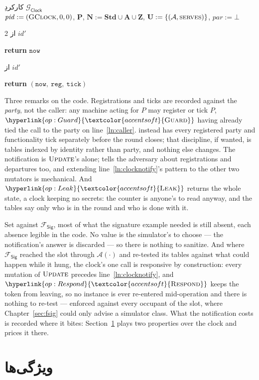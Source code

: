 \documentclass[10pt,oneside,openany]{book}
\makeatletter
\newcommand{\Ps}{\mathbf{P}}
\newcommand{\PID}{\mathit{pid}}
\newcommand{\admits}{\mathbf{N}}
\newcommand{\Apid}{\mathbf{A}}
\newcommand{\Zpid}{\mathbf{Z}}
\newcommand{\Stdpid}{\mathbf{Std}}
\newcommand{\pars}{\mathit{par}}
\newcommand{\uses}{\mathbf{U}}
\newcommand{\serves}{\op{serves}}
\newcommand{\Adv}{\mathcal{A}}
\newcommand{\op}[1]{\textnormal{\textsc{#1}}}
\newcommand{\opl}[1]{\hyperlink{op:#1}{\textcolor{accentsoft}{\op{#1}}}}
\newcommand{\id}{id}
\newcommand{\Fsig}{\mathcal{F}_{\mathsf{Sig}}}
\newcommand{\Gclock}{\mathcal{G}_{\mathsf{Clock}}}
\newcommand{\none}{\bot}
\newcommand{\V}[1]{\mathtt{#1}}
\newcounter{contline}
\newcommand{\algcont}{\setcounter{ALG@line}{\value{contline}}}
\newcommand{\algsave}{\setcounter{contline}{\value{ALG@line}}}
\newcommand{\params}[1]{{\footnotesize\normalfont\color{black!72} #1}}
\newcommand{\opsig}[1]{\textcolor{accent}{\underline{\smash{#1}}}}
\theoremstyle{accentdef}
\theoremstyle{accentplain}
\makeatother
\begin{document}
\begin{interface}[nofloat]{کارکردِ $\Gclock$ \\
\params{$\PID := (\op{G}\op{Clock},0,0)$, \quad $\Ps$, \quad
$\admits := \Stdpid \cup \Apid \cup \Zpid$, \quad $\uses := \{(\Adv,\serves)\}$, \quad $\pars := \none$}}
{\begin{multicols}{2}
\opsig{$\id.\op{Read}()$} \quad از $\id'$
\begin{algorithmic}[1]
\algcont
\State \textbf{return} $\V{now}$
\algsave
\end{algorithmic}
\vspace{1.4ex}

\opsig{$\id.\op{Leak}()$} \quad از $\id'$
\begin{algorithmic}[1]
\algcont
\State \textbf{return} $(\V{now},\ \V{reg},\ \V{tick})$
\algsave
\end{algorithmic}
\end{multicols}}
\end{interface}

Three remarks on the code. Registrations and ticks are recorded against the \emph{party}, not the
caller: any machine acting for $P$ may register or tick $P$, $\opl{Guard}$ having already tied the
call to the party on line~\ref{ln:caller}. \cite{BMTZ17} instead has every registered party and
functionality tick separately before the round closes; that discipline, if wanted, is tables
indexed by identity rather than party, and nothing else changes. The notification is
$\op{Update}$'s alone; \cite{BMTZ17} tells the adversary about registrations and departures too,
and extending line~\ref{ln:clocknotify}'s pattern to the other two mutators is mechanical. And
$\opl{Leak}$ returns the whole state, a clock keeping no secrets: the counter is anyone's to read
anyway, and the tables say only who is in the round and who is done with it.

Set against $\Fsig$, most of what the signature example needed is still absent, each absence
legible in the code. No value is the simulator's to choose --- the notification's answer is
discarded --- so there is nothing to sanitize. And where $\Fsig$ reached the slot through
$\Adv(\cdot)$ and re-tested its tables against what could happen while it hung, the clock's one
call is responsive by construction: every mutation of $\op{Update}$ precedes
line~\ref{ln:clocknotify}, and $\opl{Respond}$ keeps the token from leaving, so no instance is
ever re-entered mid-operation and there is nothing to re-test --- enforced against every occupant
of the slot, where Chapter~\ref{sec:fsig} could only advise a simulator class. What the
notification costs is recorded where it bites: Section~\ref{sec:clockprops} plays two properties
over the clock and prices it there.

\section{ویژگی‌ها}\label{sec:clockprops}
\end{document}
